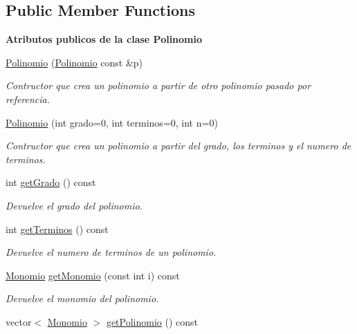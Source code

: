 \subsection*{Public Member Functions}
\begin{Indent}{\bf Atributos publicos de la clase Polinomio}\par
\begin{DoxyCompactItemize}
\item 
\hyperlink{classed_1_1Polinomio_ad2a480e2e09d0afa8f58907f5460a357}{Polinomio} (\hyperlink{classed_1_1Polinomio}{Polinomio} const \&p)
\begin{DoxyCompactList}\small\item\em Contructor que crea un polinomio a partir de otro polinomio pasado por referencia. \end{DoxyCompactList}\item 
\hyperlink{classed_1_1Polinomio_ab357d5df6da0d216f079f485937b6266}{Polinomio} (int grado=0, int terminos=0, int n=0)
\begin{DoxyCompactList}\small\item\em Contructor que crea un polinomio a partir del grado, los terminos y el numero de terminos. \end{DoxyCompactList}\item 
int \hyperlink{classed_1_1Polinomio_a6652a2361f03daf45b38a97e8b146d15}{get\-Grado} () const 
\begin{DoxyCompactList}\small\item\em Devuelve el grado del polinomio. \end{DoxyCompactList}\item 
int \hyperlink{classed_1_1Polinomio_a9c54328800c74a91e04cb22f968e7510}{get\-Terminos} () const 
\begin{DoxyCompactList}\small\item\em Devuelve el numero de terminos de un polinomio. \end{DoxyCompactList}\item 
\hyperlink{classed_1_1Monomio}{Monomio} \hyperlink{classed_1_1Polinomio_ac2b20ed929a98c449c635cc70dc82f20}{get\-Monomio} (const int i) const 
\begin{DoxyCompactList}\small\item\em Devuelve el monomio del polinomio. \end{DoxyCompactList}\item 
vector$<$ \hyperlink{classed_1_1Monomio}{Monomio} $>$ \hyperlink{classed_1_1Polinomio_a80086e21883c1108260006302135eade}{get\-Polinomio} () const 

\end{DoxyCompactItemize}
\end{Indent}
